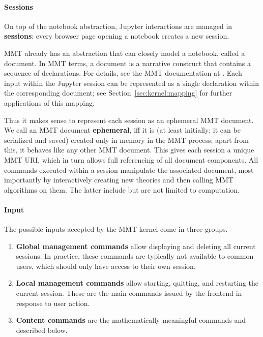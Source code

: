 \paragraph{Sessions}
On top of the notebook abstraction, Jupyter interactions are managed in \textbf{sessions}: every browser page opening a notebook creates a new session.

MMT already has an abstraction that can closely model a notebook, called a document. 
In MMT terms, a document is a narrative construct that contains a sequence of declarations. 
For details, see the MMT documentation at \cite{Rabe:MMT}. 
Each input within the Jupyter session can be represented as a single declaration within the corresponding document; see Section~\ref{sec:kernel:mapping} for further applications of this mapping. 

Thus it makes sense to represent each session as an ephemeral MMT document.
We call an MMT document \textbf{ephemeral}, iff it is (at least initially; it can be serialized and saved) created only in memory in the MMT process; apart from this, it behaves like any other MMT document.
This gives each session a unique MMT URI, which in turn allows full referencing of all document components.
All commands executed within a session manipulate the associated document, most importantly by interactively creating new theories and then calling MMT algorithms on them.
The latter include but are not limited to computation.

\paragraph{Input}
The possible inputs accepted by the MMT kernel come in three groups.
\begin{enumerate}
\item \textbf{Global management commands} allow displaying and deleting all current sessions.
 In practice, these commands are typically not available to common users, which should only have access to their own session.
\item \textbf{Local management commands} allow starting, quitting, and restarting the current session. These are the main commands issued by the frontend in response to user action.
\item \textbf{Content commands} are the mathematically meaningful commands and described below.
\end{enumerate}

